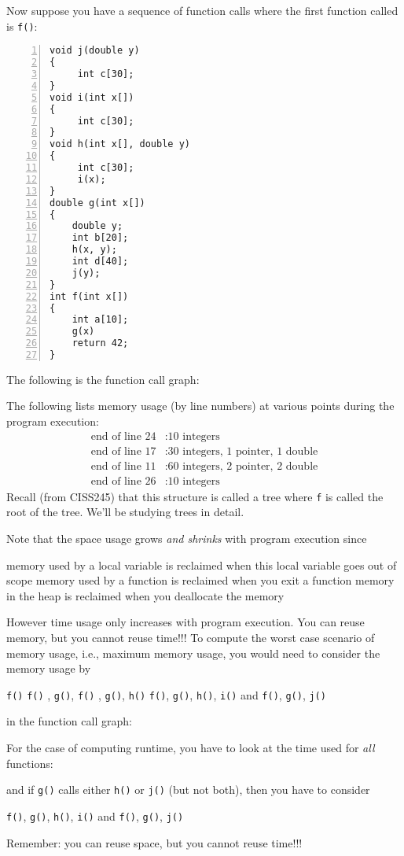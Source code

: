  


Now suppose you have a sequence of function calls where the first function
called is \verb!f()!:
\begin{Verbatim}[frame=single,fontsize=\footnotesize,numbers=left]
void j(double y)
{
     int c[30];
}
void i(int x[])
{
     int c[30];
}
void h(int x[], double y)
{
     int c[30];
     i(x);
}
double g(int x[])
{
    double y;
    int b[20];
    h(x, y);
    int d[40];
    j(y);
}
int f(int x[])
{
    int a[10];
    g(x)
    return 42;
}
\end{Verbatim}
The following is the function call graph:

The following lists memory usage (by line numbers) at various points
during the program execution:
\begin{align*}
  \text{end of line 24}&: \text{10 integers} \\
  \text{end of line 17}&: \text{30 integers, 1 pointer, 1 double} \\
  \text{end of line 11}&: \text{60 integers, 2 pointer, 2 double} \\
  \text{end of line 26}&: \text{10 integers}
\end{align*}
Recall (from CISS245) that this structure is called a tree where \verb!f! is called the root
of the tree.
We'll be studying trees in detail.

Note that the space usage grows \textit{and shrinks} with program execution since
\begin{enumerate}[nosep]
  \li
  memory used by a local variable is reclaimed when this local variable
  goes out of scope
  \li
  memory used by a function is reclaimed when you exit a function
  \li 
  memory in the heap is reclaimed when you deallocate the memory
\end{enumerate}
However time usage only increases with program execution.
You can reuse memory, but you cannot reuse time!!!
To compute the worst case scenario of memory usage, i.e., maximum memory usage,
you would need to consider the
memory usage by
\begin{enumerate}[nosep]  
  \li \verb!f()!
  \li \verb!f()! , \verb!g()!, 
  \li \verb!f()! , \verb!g()!, \verb!h()!
  \li \verb!f()!, \verb!g()!, \verb!h()!, \verb!i()! and
  \li \verb!f()!, \verb!g()!, \verb!j()!
\end{enumerate}
in the function call graph:

For the case of computing runtime, you have to look at the time used
for \textit{all} functions:

and if \verb!g()! calls either \verb!h()! or \verb!j()! (but not both),
then you have to consider
\begin{enumerate}[nosep]  
  \li \verb!f()!, \verb!g()!, \verb!h()!, \verb!i()! and
  \li \verb!f()!, \verb!g()!, \verb!j()!
\end{enumerate}

Remember: you can reuse space, but you cannot reuse time!!!





%
